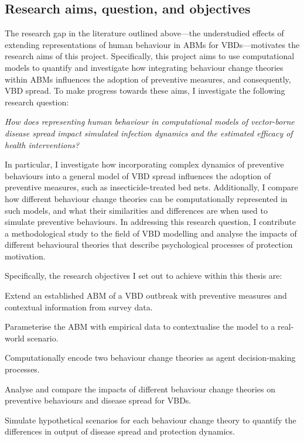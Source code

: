 \clearpage
\subsection{Research aims, question, and objectives}\label{sec:research-aims}

The research gap in the literature outlined above---the understudied effects of extending representations of human behaviour in ABMs for VBDs---motivates the research aims of this project. Specifically, this project aims to use computational models to quantify and investigate how integrating behaviour change theories within ABMs influences the adoption of preventive measures, and consequently, VBD spread. To make progress towards these aims, I investigate the following research question:

\vspace{.5cm}
\noindent\textit{How does representing human behaviour in computational models of vector-borne disease spread impact simulated infection dynamics and the estimated efficacy of health interventions?}
\vspace{.5cm}

In particular, I investigate how incorporating complex dynamics of preventive behaviours into a general model of VBD spread influences the adoption of preventive measures, such as insecticide-treated bed nets. Additionally, I compare how different behaviour change theories can be computationally represented in such models, and what their similarities and differences are when used to simulate preventive behaviours. In addressing this research question, I contribute a methodological study to the field of VBD modelling and analyse the impacts of different behavioural theories that describe psychological processes of protection motivation.

Specifically, the research objectives I set out to achieve within this thesis are:

\begin{objectives}[itemindent=4em]

\item Extend an established ABM of a VBD outbreak with preventive measures and contextual information from survey data.\label{ro1}

\item Parameterise the ABM with empirical data to contextualise the model to a real-world scenario.\label{ro2}

\item Computationally encode two behaviour change theories as agent decision-making processes.\label{ro3}

\item Analyse and compare the impacts of different behaviour change theories on preventive behaviours and disease spread for VBDs.\label{ro4}

\item Simulate hypothetical scenarios for each behaviour change theory to quantify the differences in output of disease spread and protection dynamics.\label{ro5}

\end{objectives}

